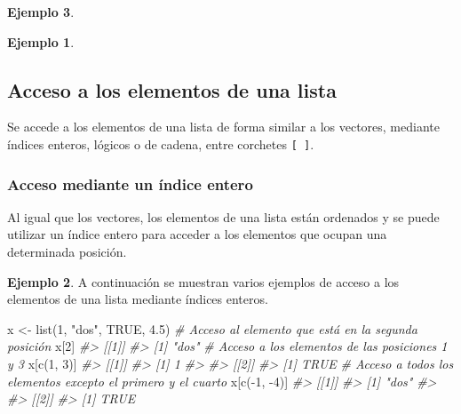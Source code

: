 \documentclass[
]{book}
\newenvironment{Shaded}{\begin{snugshade}}{\end{snugshade}}
\newcommand{\CommentTok}[1]{\textcolor[rgb]{0.56,0.35,0.01}{\textit{#1}}}
\newcommand{\ConstantTok}[1]{\textcolor[rgb]{0.00,0.00,0.00}{#1}}
\newcommand{\DecValTok}[1]{\textcolor[rgb]{0.00,0.00,0.81}{#1}}
\newcommand{\FloatTok}[1]{\textcolor[rgb]{0.00,0.00,0.81}{#1}}
\newcommand{\FunctionTok}[1]{\textcolor[rgb]{0.00,0.00,0.00}{#1}}
\newcommand{\NormalTok}[1]{#1}
\newcommand{\OtherTok}[1]{\textcolor[rgb]{0.56,0.35,0.01}{#1}}
\newcommand{\SpecialCharTok}[1]{\textcolor[rgb]{0.00,0.00,0.00}{#1}}
\newcommand{\StringTok}[1]{\textcolor[rgb]{0.31,0.60,0.02}{#1}}
\theoremstyle{definition}
\theoremstyle{definition}
\newtheorem{example}{Ejemplo}[chapter]
\theoremstyle{definition}
\theoremstyle{definition}
\theoremstyle{remark}
\begin{document}
\begin{example}
\begin{example}
\end{example}

\hypertarget{acceso-a-los-elementos-de-una-lista}{%
\subsection{Acceso a los elementos de una lista}\label{acceso-a-los-elementos-de-una-lista}}

Se accede a los elementos de una lista de forma similar a los vectores, mediante índices enteros, lógicos o de cadena, entre corchetes \texttt{{[}\ {]}}.

\hypertarget{acceso-mediante-un-uxedndice-entero-1}{%
\subsubsection{Acceso mediante un índice entero}\label{acceso-mediante-un-uxedndice-entero-1}}

Al igual que los vectores, los elementos de una lista están ordenados y se puede utilizar un índice entero para acceder a los elementos que ocupan una determinada posición.

\begin{example}

A continuación se muestran varios ejemplos de acceso a los elementos de una lista mediante índices enteros.

\begin{Shaded}
\begin{Highlighting}[]
\NormalTok{x }\OtherTok{\textless{}{-}} \FunctionTok{list}\NormalTok{(}\DecValTok{1}\NormalTok{, }\StringTok{"dos"}\NormalTok{, }\ConstantTok{TRUE}\NormalTok{, }\FloatTok{4.5}\NormalTok{)}
\CommentTok{\# Acceso al elemento que está en la segunda posición}
\NormalTok{x[}\DecValTok{2}\NormalTok{]}
\CommentTok{\#\textgreater{} [[1]]}
\CommentTok{\#\textgreater{} [1] "dos"}
\CommentTok{\# Acceso a los elementos de las posiciones 1 y 3}
\NormalTok{x[}\FunctionTok{c}\NormalTok{(}\DecValTok{1}\NormalTok{, }\DecValTok{3}\NormalTok{)]}
\CommentTok{\#\textgreater{} [[1]]}
\CommentTok{\#\textgreater{} [1] 1}
\CommentTok{\#\textgreater{} }
\CommentTok{\#\textgreater{} [[2]]}
\CommentTok{\#\textgreater{} [1] TRUE}
\CommentTok{\# Acceso a todos los elementos excepto el primero y el cuarto}
\NormalTok{x[}\FunctionTok{c}\NormalTok{(}\SpecialCharTok{{-}}\DecValTok{1}\NormalTok{, }\SpecialCharTok{{-}}\DecValTok{4}\NormalTok{)]}
\CommentTok{\#\textgreater{} [[1]]}
\CommentTok{\#\textgreater{} [1] "dos"}
\CommentTok{\#\textgreater{} }
\CommentTok{\#\textgreater{} [[2]]}
\CommentTok{\#\textgreater{} [1] TRUE}
\end{Highlighting}
\end{Shaded}


\end{example}
\end{example}
\end{document}
